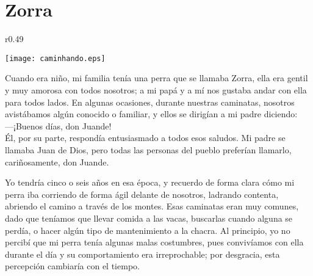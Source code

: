 \cleardoublepage
\newpage
\ifdefined\EnableIncludeImages
\fi
\chapter{Zorra}


\ifdefined\EnableIncludeImages
\begin{wrapfigure}{r}{0.49\textwidth}
  \begin{center}
  \vspace{-30pt}
    \texttt{[image: caminhando.eps]}
  \end{center}
  \vspace{-20pt}
\end{wrapfigure}
\fi
Cuando era niño, mi familia tenía una perra que se llamaba Zorra, ella era gentil y muy amorosa con todos nosotros; a mi papá y a mí nos gustaba andar con ella para todos lados. En algunas ocasiones, durante nuestras caminatas, nosotros avistábamos algún conocido o familiar, y ellos se dirigían a mi padre diciendo:\\\indent
---¡Buenos días, don Juande!\\\indent
Él, por su parte, respondía entusiasmado a todos esos saludos.
Mi padre se llamaba Juan de Dios, pero todas las personas del pueblo preferían llamarlo, cariñosamente, don Juande.

Yo tendría cinco o seis años en esa época, y recuerdo de forma clara cómo mi perra iba corriendo de forma ágil delante de nosotros, ladrando contenta, abriendo el camino a través de los montes.
Esas caminatas eran muy comunes, dado que teníamos que llevar comida a las vacas, buscarlas cuando alguna se perdía, o hacer algún tipo de mantenimiento a la chacra.
Al principio, yo no percibí que mi perra tenía algunas malas costumbres, 
pues convivíamos con ella durante el día y su comportamiento era irreprochable; 
por desgracia, esta percepción cambiaría con el tiempo.

